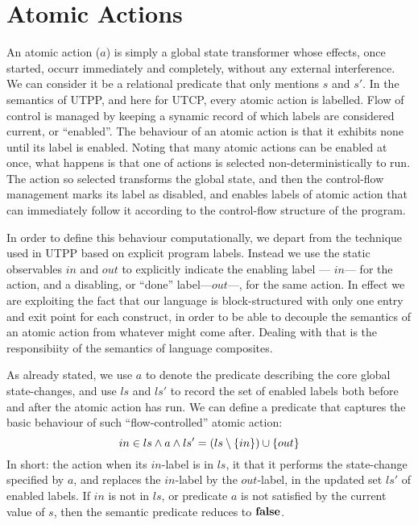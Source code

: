 \section{Atomic Actions}\label{sec:atomic}

An atomic action ($a$) is simply a global state transformer whose effects,
once started,
occurr immediately and completely, without any external interference.
We can consider it be a relational predicate that only mentions $s$ and $s'$.
In the semantics of UTPP, and here for UTCP,
every atomic action is labelled.
Flow of control is managed by keeping a synamic record
of which labels are considered current, or ``enabled''.
The behaviour of an atomic action is that it exhibits none
until its label is enabled.
Noting that many atomic actions can be enabled at once,
what happens is that one of actions is selected non-deterministically to run.
The action so selected transforms the global state,
and then the control-flow management marks its label as disabled,
and enables labels of atomic action that can immediately follow it
according to the control-flow structure of the program.

In order to define this behaviour computationally,
we depart from the technique used in UTPP based on explicit program labels.
Instead we use the static observables $in$ and $out$ to explicitly indicate
the enabling label --- $in$--- for the action,
and a disabling, or ``done'' label---$out$---, for the same action.
In effect we are exploiting the fact that our language is block-structured
with only one entry and exit point for each construct,
in order to be able to decouple the semantics of an atomic action
from whatever might come after.
Dealing with that is the responsibiity of the semantics of language composites.

As already stated,
we use $a$ to denote the predicate describing the core global state-changes,
and  use $ls$ and $ls'$ to record the set of enabled labels both before
and after the atomic action has run.
We can define a predicate that captures the basic behaviour
of such ``flow-controlled'' atomic action:
\begin{equation}
  in \in ls
  \land
  a
  \land
  ls'=(ls\setminus\{{in}\})\cup\{{out}\}
\end{equation}
In short: the action when its $in$-label is in $ls$,
it that it performs the state-change specified by $a$,
and replaces the $in$-label by the $out$-label,
in the updated set $ls'$ of enabled labels.
If $in$ is not in $ls$,
or predicate $a$ is not satisfied by the current value of $s$,
then the semantic predicate reduces to $\mathbf{false}$.

